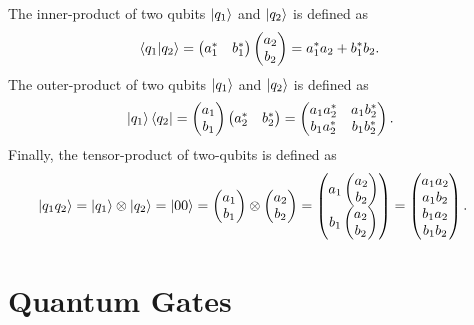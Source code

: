 \documentclass[10pt]{article}
\begin{document}
The inner-product of two qubits $\ket{q_1}$ and $\ket{q_2}$ is defined as
\begin{align}
\bra{q_1}\ket{q_2}
=
\begin{pmatrix} 
a^*_1 & b^*_1
\end{pmatrix}
\begin{pmatrix}
a_2 \\ b_2
\end{pmatrix}
=
a^*_1a_2+b^*_1b_2
.\end{align}
The outer-product of two qubits $\ket{q_1}$ and $\ket{q_2}$ is defined as
\begin{align}
\ket{q_1}\bra{q_2}
=
\begin{pmatrix} 
a_1 \\ b_1
\end{pmatrix}
\begin{pmatrix}
a^*_2 & b^*_2
\end{pmatrix}
=
\begin{pmatrix}
a_1a^*_2 & a_1b^*_2
\\
b_1a^*_2 & b_1b^*_2
\end{pmatrix}
.\end{align}
Finally, the tensor-product of two-qubits is defined as
\begin{align}
\ket{q_1q_2}
=
\ket{q_1}\otimes\ket{q_2}
=
\ket{00}&=\begin{pmatrix}
a_1 \\ b_1
\end{pmatrix}
\otimes
\begin{pmatrix}
a_2 \\ b_2
\end{pmatrix}
=\begin{pmatrix}
a_1\begin{pmatrix}
a_2 \\ b_2
\end{pmatrix}
\\
b_1\begin{pmatrix}
a_2 \\ b_2
\end{pmatrix}
\end{pmatrix}
=\begin{pmatrix}
a_1a_2 \\ a_1b_2 \\ b_1a_2 \\ b_1b_2
\end{pmatrix}
.\end{align}

\section{Quantum Gates}
\end{document}

